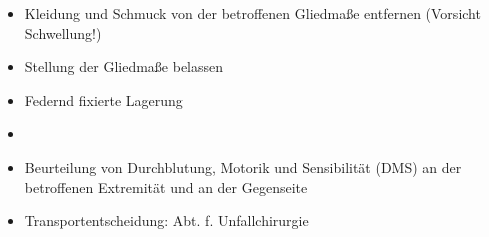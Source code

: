 \label{m:verrenkung}
\begin{itemize}
  \item Kleidung und Schmuck von der betroffenen Gliedmaße entfernen 
  (Vorsicht Schwellung!)
  \item Stellung der Gliedmaße belassen
  \item Federnd fixierte Lagerung
  \item {}
  \item Beurteilung von Durchblutung, Motorik und
  Sensibilität (DMS) an der betroffenen Extremität und an
  der Gegenseite
  \item Transportentscheidung: Abt. f. Unfallchirurgie
\end{itemize}